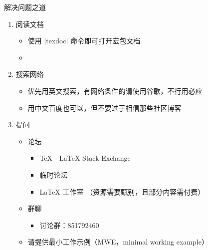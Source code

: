 \begin{frame}[fragile]{解决问题之道}
  \begin{enumerate}
    \item 阅读文档
          \begin{itemize}
            \item 使用 |texdoc| 命令即可打开宏包文档
            \item {}
          \end{itemize}
    \item 搜索网络
          \begin{itemize}
            \item 优先用英文搜索，有网络条件的请使用谷歌，不行用必应
            \item 用中文百度也可以，但不要过于相信那些社区博客
          \end{itemize}
    \item 提问
          \begin{itemize}
            \item 论坛
                  \begin{itemize}
                    \item \TeX{} - \LaTeX{} Stack Exchange 
                    \item \CTeX{} 临时论坛 
                    \item \LaTeX{} 工作室 （资源需要甄别，且部分内容需付费）
                  \end{itemize}
            \item 群聊
                  \begin{itemize}
                    \item \hithesis 讨论群：851792460
                  \end{itemize}
            \item 请提供\alert{最小工作示例（MWE，minimal working example）}
          \end{itemize}
  \end{enumerate}
\end{frame}


